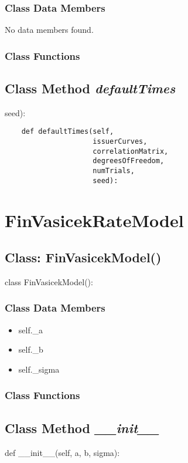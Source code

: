\documentclass[twoside,11pt]{book}
\begin{document}
\subsubsection{Class Data Members}
No data members found.

\subsubsection{Class Functions}

\subsection{Class Method {\it defaultTimes}}
seed):

\begin{lstlisting}
    def defaultTimes(self,
                     issuerCurves,
                     correlationMatrix,
                     degreesOfFreedom,
                     numTrials,
                     seed):
\end{lstlisting}

\newpage
\section{FinVasicekRateModel}

\subsection{Class: FinVasicekModel()}
class FinVasicekModel():

\subsubsection{Class Data Members}
\begin{itemize}
\item{self.\_a}
\item{self.\_b}
\item{self.\_sigma}
\end{itemize}

\subsubsection{Class Functions}

\subsection{Class Method {\it \_\_init\_\_}}
def \_\_init\_\_(self, a, b, sigma):
\end{document}
